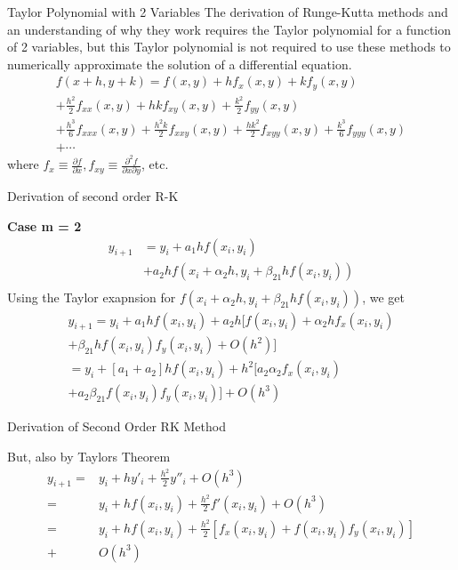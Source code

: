 \documentclass[12pt]{beamer}
\begin{document}
\begin{frame}{Taylor Polynomial with 2 Variables} 
The derivation of Runge-Kutta methods and an understanding of why they work requires the Taylor polynomial for a function of 2 variables, but this Taylor polynomial is not required to use these methods to numerically approximate the solution of a differential equation.
\begin{multline*}
f(x+h,y+k)=f(x,y)+hf_x(x,y)+kf_y(x,y) \\
	+\frac{h^2}{2}f_{xx}(x,y) + hkf_{xy}(x,y)+\frac{k^2}{2}f_{yy}(x,y) \\
	+\frac{h^3}{6}f_{xxx}(x,y)+\frac{h^2k}{2}f_{xxy}(x,y)+\frac{hk^2}{2}f_{xyy}(x,y)+\frac{k^3}{6}f_{yyy}(x,y) \\
	+ \dotsm
\end{multline*}
where $f_x \equiv \frac{\partial f}{\partial x}, f_{xy} \equiv \frac{\partial^2 f}{\partial x \partial y}$, etc.

\end{frame} 

\begin{frame}{Derivation of second order R-K} 

{\bf Case  m = 2}
\begin{align*} 
y_{i+1} &=  y_i + a_1 h f(x_i, y_i)  \\
   &+ a_2 h f(x_i + \alpha_2 h, y_i + \beta_{21}hf(x_i,y_i))  \\ 
\end{align*} 
Using the Taylor exapnsion for $f(x_i + \alpha_2 h, y_i + \beta_{21}hf(x_i,y_i))$, we get
\begin{multline*} 
y_{i+1} = y_i + a_1 h f(x_i, y_i)+ a_2 h [ f(x_i,y_i) +   \alpha_2hf_x(x_i,y_i) \\
+ \beta_{21} h f (x_i, y_i) f_y(x_i,y_i) + O(h^2) ] \\
= y_i + [a_1 + a_2] h f(x_i, y_i) + h^2 [ a_2 \alpha_2 f_x(x_i,y_i) \\
+ a_2 \beta_{21}f(x_i,y_i)f_y(x_i,y_i)] + O(h^3) 
\end{multline*} 


\end{frame} 

\begin{frame}{Derivation of Second Order RK Method}  

But, also by Taylors Theorem 
\begin{align*} 
y_{i+1} =& y_i + h y'_i + \frac{h^2}{2} y''_i + O(h^3) \\
	=& y_i + hf(x_i,y_i) + \frac{h^2}{2} f'(x_i,y_i) + O(h^3) \\
           =& y_i + h f(x_i, y_i) + \frac{h^2}{2}[f_x(x_i,y_i) + f(x_i,y_i) f_y(x_i,y_i)] \\ 
	+& O(h^3) 
\end{align*} 

\end{frame} 
\end{document}

